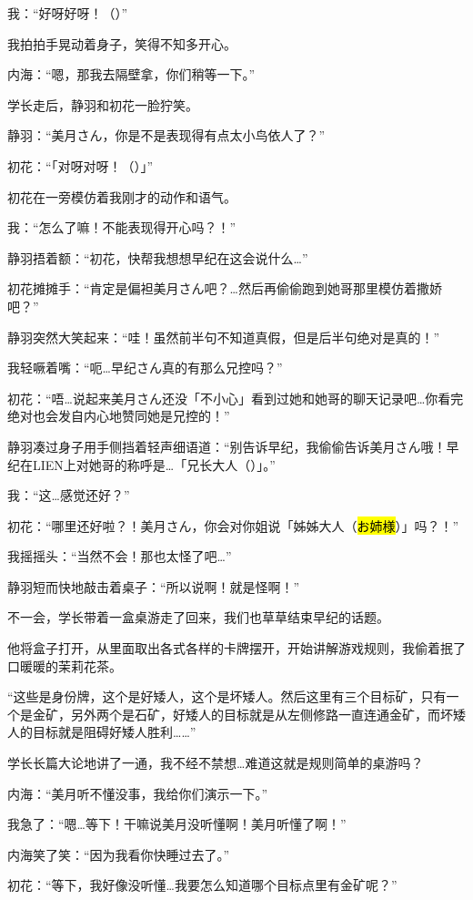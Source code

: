 我：“好呀好呀！（）”

我拍拍手晃动着身子，笑得不知多开心\heartsmile。

内海：“嗯，那我去隔壁拿，你们稍等一下。”

学长走后，静羽和初花一脸狞笑。

静羽：“美月さん，你是不是表现得有点太小鸟依人了？”

初花：“「对呀对呀！（）」”

初花在一旁模仿着我刚才的动作和语气。

我：“怎么了嘛！不能表现得开心吗？！”

静羽捂着额：“初花，快帮我想想早纪在这会说什么…”

初花摊摊手：“肯定是偏袒美月さん吧？…然后再偷偷跑到她哥那里模仿着撒娇吧？”

静羽突然大笑起来：“哇！虽然前半句不知道真假，但是后半句绝对是真的！”

我轻噘着嘴：“呃…早纪さん真的有那么兄控吗？”

初花：“唔…说起来美月さん还没「不小心」看到过她和她哥的聊天记录吧…你看完绝对也会发自内心地赞同她是兄控的！”

静羽凑过身子用手侧挡着轻声细语道：“别告诉早纪，我偷偷告诉美月さん哦！早纪在LIEN上对她哥的称呼是…「兄长大人（）」。”

我：“这…感觉还好？”

初花：“哪里还好啦？！美月さん，你会对你姐说「姊姊大人（\hl{お姉様}）」吗？！”

我摇摇头：“当然不会！那也太怪了吧…”

静羽短而快地敲击着桌子：“所以说啊！就是怪啊！”

不一会，学长带着一盒桌游走了回来，我们也草草结束早纪的话题。

他将盒子打开，从里面取出各式各样的卡牌摆开，开始讲解游戏规则，我偷着抿了口暖暖的茉莉花茶。

“这些是身份牌，这个是好矮人，这个是坏矮人。然后这里有三个目标矿，只有一个是金矿，另外两个是石矿，好矮人的目标就是从左侧修路一直连通金矿，而坏矮人的目标就是阻碍好矮人胜利……”

学长长篇大论地讲了一通，我不经不禁想…难道这就是规则简单的桌游吗？

内海：“美月听不懂没事，我给你们演示一下。”

我急了：“嗯…等下！干嘛说美月没听懂啊！美月听懂了啊！”

内海笑了笑：“因为我看你快睡过去了。”

初花：“等下，我好像没听懂…我要怎么知道哪个目标点里有金矿呢？”

